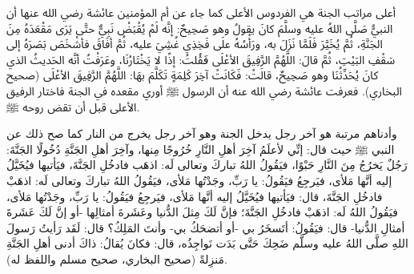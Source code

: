 أعلى مراتب الجنة هي الفردوس الأعلى كما جاء عن أم المؤمنين عائشة رضي الله عنها أن النبيُّ صَلَّى اللهُ عليه وسلَّمَ كانَ يقولُ وهو صَحِيحٌ: إنَّه لَمْ يُقْبَضْ نَبِيٌّ حتَّى يَرَى مَقْعَدَهُ مِنَ الجَنَّةِ، ثُمَّ يُخَيَّرَ فَلَمَّا نَزَلَ به، ورَأْسُهُ علَى فَخِذِي غُشِيَ عليه، ثُمَّ أفَاقَ فأشْخَصَ بَصَرَهُ إلى سَقْفِ البَيْتِ، ثُمَّ قالَ: اللَّهُمَّ الرَّفِيقَ الأعْلَى \.فَقُلتُ: إذًا لا يَخْتَارُنَا، وعَرَفْتُ أنَّه الحَديثُ الذي كانَ يُحَدِّثُنَا وهو صَحِيحٌ، قالَتْ: فَكَانَتْ آخِرَ كَلِمَةٍ تَكَلَّمَ بهَا: اللَّهُمَّ الرَّفِيقَ الأعْلَى {\footnotesize (صحيح البخاري)}. فعرفت عائشة رضي الله عنه أن الرسول ﷺ أوري مقعده في الجنة فاختار الرفيق الأعلى  قبل أن تقض روحه ﷺ.


وأدناهم مرتبة هو آخر رجل يدخل الجنة وهو آخر رجل يخرج من النار كما صح ذلك عن النبي ﷺ حيث قال: إنِّي لأعلَمُ آخِرَ أهلِ النَّارِ خُرُوجًا مِنها، وآخِرَ أهلِ الجَنَّةِ دُخُولًا الجَنَّةَ: رَجُلٌ يَخرُجُ مِنَ النَّارِ حَبْوًا، فيَقُولُ اللهُ تباركَ وتعالى لَه: اذهَب فادخُلِ الجَنَّةَ، فيَأتيها فيُخَيَّلُ إليه أنَّها مَلأى، فيَرجِعُ فيَقُولُ: يا رَبِّ، وجَدْتُها مَلأى، فيَقُولُ اللهُ تباركَ وتعالى لَه: اذهَبْ فادخُلِ الجَنَّةَ، قال: فيَأتيها فيُخَيَّلُ إليه أنَّها مَلأى، فيَرجِعُ فيَقُولُ: يا رَبِّ، وجَدْتُها مَلأى، فيَقُولُ اللهُ لَه: اذهَبْ فادخُلِ الجَنَّةَ؛ فإنَّ لَكَ مِثلَ الدُّنيا وعَشَرةَ أمثالِها -أو إنَّ لَكَ عَشَرةَ أمثالِ الدُّنيا- قال: فيَقُولُ: أتَسخَرُ بي -أو أتضحَكُ بي- وأنتَ المَلِكُ؟ قال: لَقَد رَأيتُ رَسولَ اللهِ صلَّى اللهُ عليه وسلَّم ضَحِكَ حَتَّى بَدَت نَواجِذُه، قال: فكانَ يُقالُ: ذاكَ أدنى أهلِ الجَنَّةِ مَنزِلةً {\footnotesize (صحيح البخاري، صحيح مسلم واللفظ له)}.




